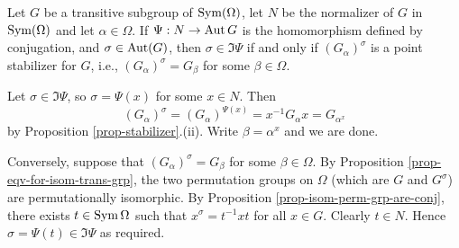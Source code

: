 \begin{theorem} \label{thm-normalizer-of-perm-grp}
	Let $G$ be a transitive subgroup of $\operatorname{Sym}(\Omega)$, let $N$ be the normalizer of $G$ in $\operatorname{Sym}(\Omega)$ and let $\alpha \in \Omega$. If $\Psi:N\to \operatorname{Aut} G$ is the homomorphism defined by conjugation, and $\sigma \in \operatorname{Aut} (G)$, then
	$ \sigma \in \Im  \Psi$ if and only if $(G_\alpha)^\sigma$ is a point stabilizer for $G$, i.e., $(G_\alpha)^\sigma = G_\beta$ for some $\beta\in\Omega$.
\end{theorem}
\begin{sketch}
	Let $\sigma \in\Im  \Psi$, so $\sigma = \Psi(x)$ for some $x \in N$. Then $$(G_\alpha)^\sigma= (G_\alpha)^{\Psi(x)} = x^{-1}G_\alpha x = G_{\alpha^x}$$
	by  Proposition \ref{prop-stabilizer}.(ii). Write $\beta = \alpha^x$ and we are done. 
	
	Conversely, suppose that $(G_\alpha)^\sigma = G_\beta$ for some $\beta \in \Omega$. By Proposition \ref{prop-eqv-for-isom-trans-grp}, the two permutation groups on $\Omega$ (which are $G$ and $G^\sigma$) are permutationally isomorphic. By Proposition \ref{prop-isom-perm-grp-are-conj}, there exists $t \in \operatorname{Sym}\Omega$ such that $x^\sigma = t^{-1}xt$ for all $x \in G$. Clearly $t \in N$. Hence $\sigma = \Psi(t) \in\Im  \Psi$ as required.
\end{sketch}

